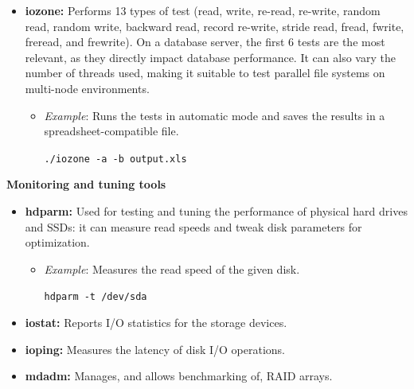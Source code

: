 \begin{exampleblock}
\begin{itemize}
\begin{itemize}
        \begin{center}
        \tt{bonnie++ -d /path/to/directory -s 4G}
        \end{center}
    \end{itemize}

    \item \textbf{iozone:} Performs 13 types of test (read, write, re-read, re-write, random read, random write, backward read, record re-write, stride read, fread, fwrite, freread, and frewrite). On a database server, the first 6 tests are the most relevant, as they directly impact database performance. It can also vary the number of threads used, making it suitable to test parallel file systems on multi-node environments.
    \begin{itemize}
        \item \textit{Example}: Runs the tests in automatic mode and saves the results in a spreadsheet-compatible file.

        \begin{center}
        \tt{./iozone -a -b output.xls}
        \end{center}
    \end{itemize}
\end{itemize}

\textbf{Monitoring and tuning tools}

\begin{itemize}
    \item \textbf{hdparm:} Used for testing and tuning the performance of physical hard drives and SSDs: it can measure read speeds and tweak disk parameters for optimization.
    \begin{itemize}
        \item \textit{Example}: Measures the read speed of the given disk.

        \begin{center}
        \tt{hdparm -t /dev/sda}
        \end{center}
    \end{itemize}

    \item \textbf{iostat:} Reports I/O statistics for the storage devices.

    \item \textbf{ioping:} Measures the latency of disk I/O operations.

    \item \textbf{mdadm:} Manages, and allows benchmarking of, RAID arrays.
\end{itemize}
\end{exampleblock}